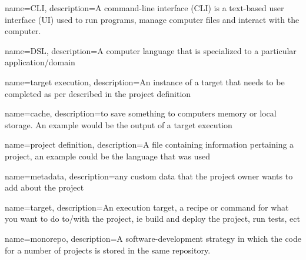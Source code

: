\usepackage{glossaries}

\makeglossaries{}


{
    name={CLI},
    description={A command-line interface (CLI) is a text-based user interface (UI) used to run programs, manage computer files and interact with the computer.}
}

{
    name=DSL,
    description={A computer language that is specialized to a particular application/domain}
}

{
    name=target execution,
    description={An instance of a \gls{target} that needs to be completed as per described in the project definition}
}

{
    name=cache,
    description={to save something to computers memory or local storage. An example would be the output of a \gls{target execution}}
}

{
    name=project definition,
    description={A file containing information pertaining a project, an example could be the language that was used}
}

{
    name=metadata,
    description={any custom data that the project owner wants to add about the project}
}

{
    name=target,
    description={An execution target, a recipe or command for what you want to do to/with the project, ie build and deploy the project, run tests, ect}
}

{
  name=monorepo,
  description={A software-development strategy in which the code for a number of projects is stored in the same repository.}
}
